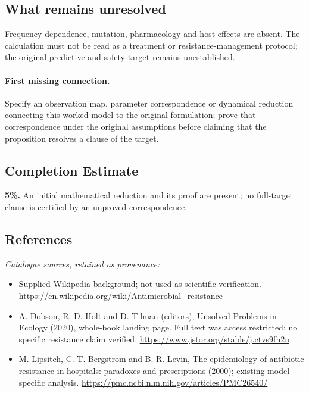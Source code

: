 \documentclass[11pt]{article}
\begin{document}
\subsection{What remains unresolved}
Frequency dependence, mutation, pharmacology and host effects are absent. The calculation must not be read as a treatment or resistance-management protocol; the original predictive and safety target remains unestablished.
\paragraph{First missing connection.} Specify an observation map, parameter correspondence or dynamical reduction connecting this worked model to the original formulation; prove that correspondence under the original assumptions before claiming that the proposition resolves a clause of the target.
\subsection{Completion Estimate}
\textbf{5\%.} An initial mathematical reduction and its proof are present; no full-target clause is certified by an unproved correspondence.
\subsection{References}
\noindent\emph{Catalogue sources, retained as provenance:}
\begin{itemize}
\item Supplied Wikipedia background; not used as scientific verification. \url{https://en.wikipedia.org/wiki/Antimicrobial_resistance}
\item A. Dobson, R. D. Holt and D. Tilman (editors), Unsolved Problems in Ecology (2020), whole-book landing page. Full text was access restricted; no specific resistance claim verified. \url{https://www.jstor.org/stable/j.ctvs9fh2n}
\item M. Lipsitch, C. T. Bergstrom and B. R. Levin, The epidemiology of antibiotic resistance in hospitals: paradoxes and prescriptions (2000); existing model-specific analysis. \url{https://pmc.ncbi.nlm.nih.gov/articles/PMC26540/}
\end{itemize}
\end{document}
